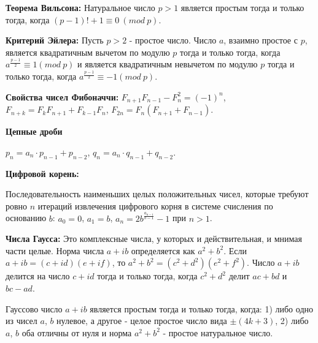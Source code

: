 \textbf{Теорема Вильсона:}
Натуральное число $p > 1$ является простым тогда и только тогда, когда $(p - 1)! + 1 \equiv 0\ (mod\ p)$.

\textbf{Критерий Эйлера:}
Пусть $p>2$ - простое число. Число $a$, взаимно простое с $p$, является квадратичным вычетом по модулю $p$ тогда и только тогда, когда
$a^{\frac{p-1}{2}}\equiv 1(mod\ p)$ и является квадратичным невычетом по модулю $p$ тогда и только тогда, когда
$a^{\frac{p-1}{2}}\equiv -1(mod\ p)$.

\textbf{Свойства чисел Фибоначчи:}
$F_{n+1}F_{n-1}-F_{n}^2=(-1)^n$, $F_{n+k}=F_{k}F_{n+1}+F_{k-1}F_{n}$, $F_{2n}=F_{n}( F_{n+1}+F_{n-1})$.

\textbf{Цепные дроби}

$p_n = a_n \cdot p_{n-1} + p_{n-2}$,
$q_n = a_n \cdot q_{n-1} + q_{n-2}$.

\textbf{Цифровой корень:}

Последовательность наименьших целых положительных чисел, которые требуют ровно $n$ итераций извлечения цифрового корня в системе счисления по основанию $b$:
$a_0=0$, $a_1=b$, $a_n=2b^{\frac{a_{n-1}}{b-1}}-1$ при $n > 1$.

\textbf{Числа Гаусса:}
Это комплексные числа, у которых и действительная, и мнимая части целые. Норма числа $a + ib$ определяется как $a^2 + b^2$.
Если $a + ib = (c + id)(e + if)$, то $a^2 + b^2 = (c^2 + d^2)(e^2 + f^2)$. Число $a + ib$ делится на число $c + id$ тогда и только тогда, когда $c^2 + d^2$ делит $ac + bd$ и $bc - ad$.

Гауссово число $a + ib$ является простым тогда и только тогда, когда: 1) либо одно из чисел $a$, $b$ нулевое, а другое - целое простое число вида $\pm (4k + 3)$,
2) либо $a$, $b$ оба отличны от нуля и норма $a^2 + b^2$ - простое натуральное число.

